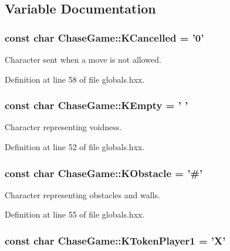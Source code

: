 \subsection{Variable Documentation}
\hypertarget{namespace_chase_game_a12d6411bb9a72150acba6060bb1587e1}{
\subsubsection[{K\-Cancelled}]{\setlength{\rightskip}{0pt plus 5cm}const char Chase\-Game\-::\-K\-Cancelled = '0'}}\label{namespace_chase_game_a12d6411bb9a72150acba6060bb1587e1}


Character sent when a move is not allowed. 



Definition at line 58 of file globals.\-hxx.

\hypertarget{namespace_chase_game_aa036d4de40188ba2e1aa36ab6cfaf1da}{
\subsubsection[{K\-Empty}]{\setlength{\rightskip}{0pt plus 5cm}const char Chase\-Game\-::\-K\-Empty = ' '}}\label{namespace_chase_game_aa036d4de40188ba2e1aa36ab6cfaf1da}


Character representing voidness. 



Definition at line 52 of file globals.\-hxx.

\hypertarget{namespace_chase_game_ad86181b2050b912dab9d69d2f0bea76e}{
\subsubsection[{K\-Obstacle}]{\setlength{\rightskip}{0pt plus 5cm}const char Chase\-Game\-::\-K\-Obstacle = '\#'}}\label{namespace_chase_game_ad86181b2050b912dab9d69d2f0bea76e}


Character representing obstacles and walls. 



Definition at line 55 of file globals.\-hxx.

\hypertarget{namespace_chase_game_a8452e2d6de618e4ca7a9f76b082b52a4}{
\subsubsection[{K\-Token\-Player1}]{\setlength{\rightskip}{0pt plus 5cm}const char Chase\-Game\-::\-K\-Token\-Player1 = 'X'}}\label{namespace_chase_game_a8452e2d6de618e4ca7a9f76b082b52a4}


